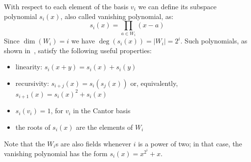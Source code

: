     With respect to each element of the basis $v_i$ we can define its subspace polynomial $s_i(x)$, also called vanishing polynomial, as:
    \begin{equation}
        s_i(x) = \prod_{a \in W_i} (x - a)
    \end{equation}
    Since $\dim(W_i) = i$ we have $\deg(s_i(x)) = |W_i| = 2^i$.
    Such polynomials, as shown in~\cite{cantor1989arithmetical,gao2010additive}, satisfy the following useful properties:
    \begin{itemize}
        \item linearity: $s_i(x+y) = s_i(x) + s_i(y)$
        \item recursivity: $s_{i+j}(x) = s_i(s_j(x))$ or, equivalently, $s_{i+1}(x) = s_i(x)^2+s_i(x)$
        \item $s_i(v_i) = 1$, for $v_i$ in the Cantor basis
        \item the roots of $s_i(x)$ are the elements of $W_i$
    \end{itemize}
    Note that the $W_i$s are also fields whenever $i$ is a power of two; in that case, the vanishing polynomial has the form $s_i(x) = x^{2^i}+x$.

